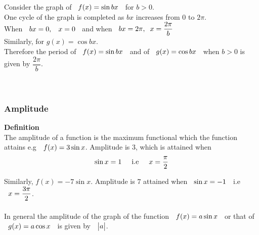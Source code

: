 \documentclass[11pt,a4paper]{article}
\begin{document}
Consider the graph of $\hspace{0.2cm} f(x) = \sin bx\hspace{0.2cm}$ for $b> 0$.\\
One cycle of the graph is completed as $bx$ increases from 0 to $2\pi$.\\
When $\hspace{0.2cm} bx = 0, \hspace{0.3cm} x = 0\hspace{0.2cm}$ and when $\hspace{0.2cm} bx = 2\pi, \hspace{0.2cm} x = \dfrac{2\pi}{b}$\\

Similarly, for $g(x) = \cos bx$.\\
Therefore the period of $\hspace{0.2cm} f(x) = \sin bx\hspace{0.2cm}$ and of $\hspace{0.2cm} g(x) = \cos bx\hspace{0.2cm}$ when $b> 0$ is given by $\dfrac{2\pi}{b}$.\\\\\\










\subsubsection{Amplitude}

\textbf{Definition}\\
The amplitude of a function is the maximum functional which the function attains e.g $\hspace{0.2cm} f(x) = 3\sin x$. Amplitude is $3$, which is attained when $$\sin x = 1\hspace{0.5cm}\text{i.e}\hspace{0.5cm} x = \dfrac{\pi}{2}$$

Similarly, $f(x) = -7\sin x$. Amplitude is $7$ attained when $\hspace{0.2cm}\sin x = -1\hspace{0.2cm}$ i.e $\hspace{0.2cm} x = \dfrac{3\pi}{2}$.\\\\




In general the amplitude of the graph of the function $\hspace{0.2cm} f(x)   = a\sin x\hspace{0.2cm}$ or that of\\ $\hspace{0.2cm} g(x) = a \cos x\hspace{0.2cm}$ is given by $\hspace{0.2cm}\begin{vmatrix}
a\\
\end{vmatrix}$.
\end{document}
